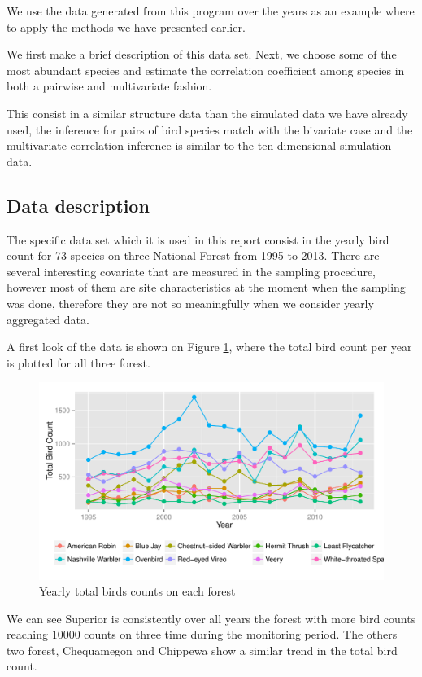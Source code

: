 \documentclass{article}
\begin{document}
We use the data generated from this program over the years as an example where to apply the methods we have presented earlier. 

We first make a brief description of this data set. Next, we choose some of the most abundant species and estimate the correlation coefficient among species in both a pairwise and multivariate fashion. 

This consist in a similar structure data than the simulated data we have already used, the inference for pairs of bird species match with the bivariate case and the multivariate correlation inference is similar to the ten-dimensional simulation data. 


\subsection{Data description}
The specific data set which it is used in this report consist in the yearly bird count for 73 species on three National Forest from 1995 to 2013.  There are several interesting covariate that are measured in the sampling procedure, however most of them are site characteristics at the moment when the sampling was done, therefore they are not so meaningfully when we consider yearly aggregated data.  

A first look of the data is shown on Figure \ref{figtr}, where the total bird count per year is plotted for all three forest. 
\begin{figure}[hbpt]
\centering
\includegraphics[width =\textwidth]{rawtrend}
 \vspace{-.5in}
\caption{Yearly total birds counts on each forest \label{figtr} }
\end{figure}


We can see Superior is consistently over all years the forest with more bird counts reaching 10000 counts on three time during the monitoring period. The others two forest, Chequamegon and Chippewa show a similar trend in the total bird count. 
 
\end{document}
